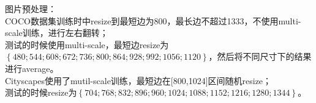 \documentclass[UTF8, a4paper]{ctexart}
\begin{document}
图片预处理：\\
COCO数据集训练时中resize到最短边为800，最长边不超过1333，不使用multi-scale训练，进行左右翻转；\\
测试的时候使用multi-scale，最短边resize为$\left\{480; 544; 608; 672; 736; 800; 864; 928; 992; 1056; 1120\right\}$，然后将不同尺寸下的结果进行average。\\
Cityscapes使用了mutil-scale训练，最短边在[800,1024]区间随机resize；\\
测试的时候resize为$\left\{704; 768; 832; 896; 960; 1024; 1088; 1152; 1216; 1280; 1344\right\}$。




\ifx\allfiles\undefined
\end{document}
